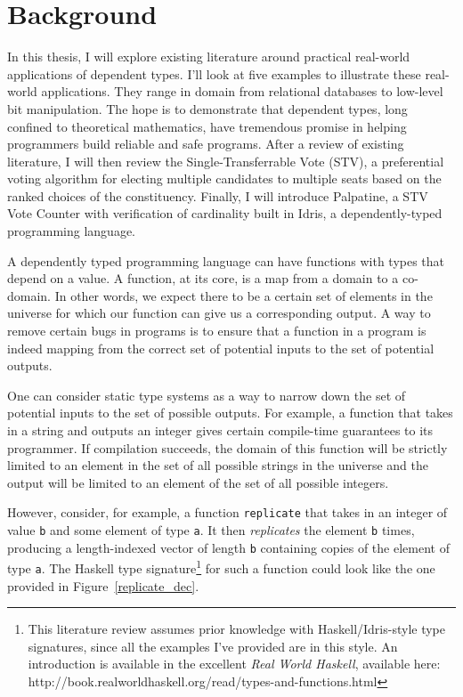 \section{Background}
In this thesis, I will explore existing literature around practical real-world
applications of dependent types. I'll look at five examples to illustrate these
real-world applications. They range in domain from relational databases to
low-level bit manipulation. The hope is to demonstrate that dependent types,
long confined to theoretical mathematics, have tremendous promise in helping
programmers build reliable and safe programs. After a review of existing
literature, I will then review the Single-Transferrable Vote (STV), a
preferential voting algorithm for electing multiple candidates to multiple seats
based on the ranked choices of the constituency. Finally, I will introduce
Palpatine, a STV Vote Counter with verification of cardinality built in
Idris, a dependently-typed programming language. 

A dependently typed programming language can have functions with types that
depend on a value. A function, at its core, is a map from a domain to a
co-domain. In other words, we expect there to be a certain set of elements in
the universe for which our function can give us a corresponding output. A way to
remove certain bugs in programs is to ensure that a function in a program is
indeed mapping from the correct set of potential inputs to the set of potential
outputs. 

One can consider static type systems as a way to narrow down the set of
potential inputs to the set of possible outputs. For example, a function that
takes in a string and outputs an integer gives certain compile-time guarantees
to its programmer. If compilation succeeds, the domain of this function will be
strictly limited to an element in the set of all possible strings in the
universe and the output will be limited to an element of the set of all possible
integers. 

However, consider, for example, a function \texttt{replicate} that takes in an
integer of value \texttt{b} and some element of type \texttt{a}. It then
\textit{replicates} the element \texttt{b} times, producing a length-indexed
vector of length \texttt{b} containing copies of the element of type \texttt{a}.
The Haskell type signature\footnote{This literature review assumes prior
knowledge with Haskell/Idris-style type signatures, since all the examples I've
provided are in this style. An introduction is available in the excellent
\textit{Real World Haskell}, available here:
http://book.realworldhaskell.org/read/types-and-functions.html} for such a
function could look like the one provided in Figure~\ref{replicate_dec}.

